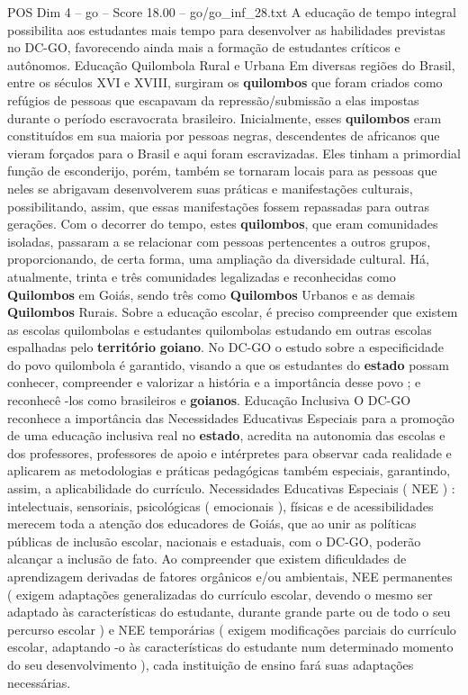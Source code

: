 \begin{textsample}{POS Dim 4 – go – Score 18.00 – go/go\_inf\_28.txt}
A educação de tempo integral possibilita aos estudantes mais tempo para desenvolver as habilidades previstas no DC-GO, favorecendo ainda mais a formação de estudantes críticos e autônomos.
Educação Quilombola Rural e Urbana Em diversas regiões do Brasil, entre os séculos XVI e XVIII, surgiram os \textbf{quilombos} que foram criados como refúgios de pessoas que escapavam da repressão/submissão a elas impostas durante o período escravocrata brasileiro.
Inicialmente, esses \textbf{quilombos} eram constituídos em sua maioria por pessoas negras, descendentes de africanos que vieram forçados para o Brasil e aqui foram escravizadas.
Eles tinham a primordial função de esconderijo, porém, também se tornaram locais para as pessoas que neles se abrigavam desenvolverem suas práticas e manifestações culturais, possibilitando, assim, que essas manifestações fossem repassadas para outras gerações.
Com o decorrer do tempo, estes \textbf{quilombos}, que eram comunidades isoladas, passaram a se relacionar com pessoas pertencentes a outros grupos, proporcionando, de certa forma, uma ampliação da diversidade cultural.
Há, atualmente, trinta e três comunidades legalizadas e reconhecidas como \textbf{Quilombos} em Goiás, sendo três como \textbf{Quilombos} Urbanos e as demais \textbf{Quilombos} Rurais.
Sobre a educação escolar, é preciso compreender que existem as escolas quilombolas e estudantes quilombolas estudando em outras escolas espalhadas pelo \textbf{território} \textbf{goiano}.
No DC-GO o estudo sobre a especificidade do povo quilombola é garantido, visando a que os estudantes do \textbf{estado} possam conhecer, compreender e valorizar a história e a importância desse povo ; e reconhecê -los como brasileiros e \textbf{goianos}.
Educação Inclusiva O DC-GO reconhece a importância das Necessidades Educativas Especiais para a promoção de uma educação inclusiva real no \textbf{estado}, acredita na autonomia das escolas e dos professores, professores de apoio e intérpretes para observar cada realidade e aplicarem as metodologias e práticas pedagógicas também especiais, garantindo, assim, a aplicabilidade do currículo.
Necessidades Educativas Especiais ( NEE ) : intelectuais, sensoriais, psicológicas ( emocionais ), físicas e de acessibilidades merecem toda a atenção dos educadores de Goiás, que ao unir as políticas públicas de inclusão escolar, nacionais e estaduais, com o DC-GO, poderão alcançar a inclusão de fato.
Ao compreender que existem dificuldades de aprendizagem derivadas de fatores orgânicos e/ou ambientais, NEE permanentes ( exigem adaptações generalizadas do currículo escolar, devendo o mesmo ser adaptado às características do estudante, durante grande parte ou de todo o seu percurso escolar ) e NEE temporárias ( exigem modificações parciais do currículo escolar, adaptando -o às características do estudante num determinado momento do seu desenvolvimento ), cada instituição de ensino fará suas adaptações necessárias.

\end{textsample}
